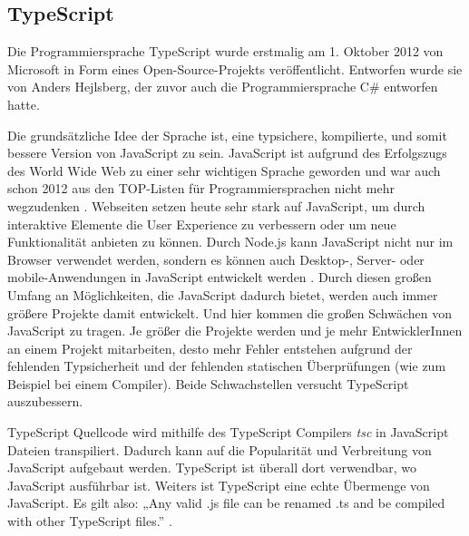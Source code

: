 \subsection{TypeScript}

Die Programmiersprache TypeScript wurde erstmalig am 1. Oktober 2012 
\cite{TypeScriptCodePlexArchived} von 
Microsoft in Form eines Open-Source-Projekts veröffentlicht. Entworfen wurde sie 
von Anders Hejlsberg, der zuvor auch die Programmiersprache C\# entworfen hatte. 

Die grundsätzliche Idee der Sprache ist, eine typsichere, kompilierte, und somit 
bessere Version von JavaScript zu sein. JavaScript ist aufgrund des Erfolgszugs
des World Wide Web zu einer sehr wichtigen Sprache geworden und war auch schon 2012 
aus den TOP-Listen für Programmiersprachen nicht mehr wegzudenken 
\cite{StackOverflowSurvey,TIOBEIndex,PYPL}. 
Webseiten setzen heute sehr stark auf JavaScript, um durch interaktive Elemente 
die User Experience zu verbessern oder um neue Funktionalität anbieten zu können. 
Durch Node.js kann JavaScript nicht nur im Browser 
verwendet werden, sondern es können auch Desktop-, Server- oder mobile-Anwendungen 
in JavaScript entwickelt werden \cite{rozentals2017mastering}.
Durch diesen großen Umfang an Möglichkeiten, die 
JavaScript dadurch bietet, werden auch immer größere Projekte damit entwickelt. 
Und hier kommen die großen Schwächen von JavaScript zu tragen. 
Je größer die Projekte werden und je mehr EntwicklerInnen an einem Projekt 
mitarbeiten, desto mehr Fehler entstehen aufgrund der fehlenden Typsicherheit
und der fehlenden statischen Überprüfungen (wie zum Beispiel bei einem Compiler). 
Beide Schwachstellen versucht TypeScript auszubessern.

TypeScript Quellcode wird mithilfe des TypeScript Compilers \emph{tsc} in JavaScript 
Dateien transpiliert. Dadurch kann auf die Popularität und Verbreitung von JavaScript 
aufgebaut werden. TypeScript ist überall dort verwendbar, wo JavaScript 
ausführbar ist. Weiters ist TypeScript eine echte Übermenge von JavaScript. 
Es gilt also: „Any valid .js file can be renamed .ts and be compiled with other 
TypeScript files.” \cite{MaharryDanTR}. 

